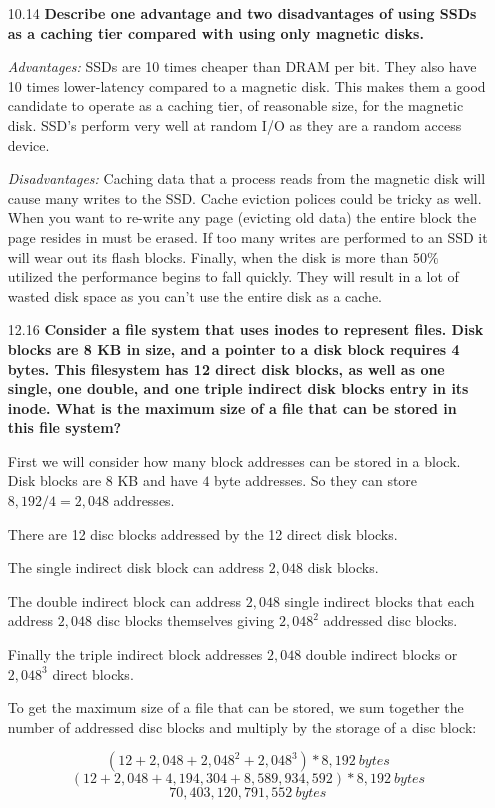 \documentclass[11pt, letterpaper]{hw}
\begin{document}
\begin{enumerate}
\item [10.14] \textbf{Describe one advantage and two disadvantages of using SSDs as a caching tier compared with using only magnetic disks.}

{\it Advantages:} SSDs are 10 times cheaper than DRAM per bit. They also have 10 times lower-latency compared to a magnetic disk. This makes them a good candidate to operate as a caching tier, of reasonable size, for the magnetic disk. SSD's perform very well at random I/O as they are a random access device.

{\it Disadvantages:} Caching data that a process reads from the magnetic disk will cause many writes to the SSD. Cache eviction polices could be tricky as well. When you want to re-write any page (evicting old data) the entire block the page resides in must be erased. If too many writes are performed to an SSD it will wear out its flash blocks. Finally, when the disk is more than $50\%$ utilized the performance begins to fall quickly. They will result in a lot of wasted disk space as you can't use the entire disk as a cache.
 
\item [12.16] \textbf{Consider a file system that uses inodes to represent files. Disk blocks are 8 KB in size, and a pointer to a disk block requires 4 bytes. This filesystem has 12 direct disk blocks, as well as one single, one double, and one triple indirect disk blocks entry in its inode. What is the maximum size of a file that can be stored in this file system?}

First we will consider how many block addresses can be stored in a block. Disk blocks are $8$ KB and have $4$ byte addresses. So they can store $8,192 / 4 = 2,048$ addresses.

There are 12 disc blocks addressed by the 12 direct disk blocks. 

The single indirect disk block can address $2,048$ disk blocks. 

The double indirect block can address $2,048$ single indirect blocks that each address $2,048$ disc blocks themselves giving $2,048^2$ addressed disc blocks. 

Finally the triple indirect block addresses $2,048$ double indirect blocks or $2,048^3$ direct blocks.

To get the maximum size of a file that can be stored, we sum together the number of addressed disc blocks and multiply by the storage of a disc block:

$$(12 + 2,048 + 2,048^2 + 2,048^3) * 8,192 \ bytes$$
$$(12 + 2,048 + 4,194,304 + 8,589,934,592) * 8,192 \ bytes$$
$$\boxed{70,403,120,791,552 \ bytes}$$
\end{enumerate}
\end{document}
